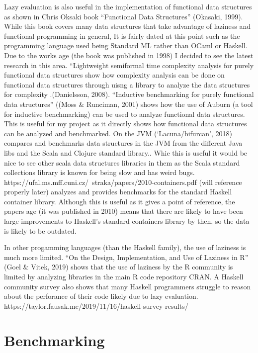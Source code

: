 \documentclass{article}
\begin{document}
Lazy evaluation is also useful in the implementation of functional data structures as shown in Chris Oksaki book “Functional Data Structures” (Okasaki, 1999). While this book covers many data structures that take advantage of laziness and functional programming in general, It is fairly dated at this point such as the programming language used being Standard ML rather than OCaml or Haskell. Due to the works age (the book was published in 1998) I decided to see the latest research in this area. “Lightweight semiformal time complexity analysis for purely functional data structures show how complexity analysis can be done on functional data structures through uisng a library to analyze the data structures for complexity .(Danielsson, 2008). “Inductive benchmarking for purely functional data structures” ((Moss & Runciman, 2001) shows how the use of Auburn (a tool for inductive benchmarking) can be used to analyze functional data structures. This is useful for my project as it directly shows how functional data structures can be analyzed and benchmarked. On the JVM (‘Lacuna/bifurcan’, 2018) compares and benchmarks data structures in the JVM from the different Java libs and the Scala and Clojure standard library.. Whie this is useful it would be nice to see other scala data structures libraries in them as the Scala  standard collections library is known for being slow and has weird bugs. https://ufal.ms.mff.cuni.cz/~straka/papers/2010-containers.pdf (will reference properly later) analyzes and provides benchmarks for the standard Haskell container library. Although this is useful as it gives a point of reference, the papers age (it was published in 2010) means that there are likely to have been large improvements to Haskell's standard containers library by then, so the data is likely to be outdated. 
 
In other progamming languages (than the Haskell family), the use of laziness is much more limited. “On the Design, Implementation, and Use of Laziness in R” (Goel & Vitek, 2019) shows that the use of laziness by the R community is limited by analyzing libraries in the main R code repository CRAN.  A Haskell community survey  also shows that many Haskell programmers struggle to reason about the perforance of their code likely due to lazy evaluation.  https://taylor.fausak.me/2019/11/16/haskell-survey-results/ 


\section{Benchmarking}
\end{document}
